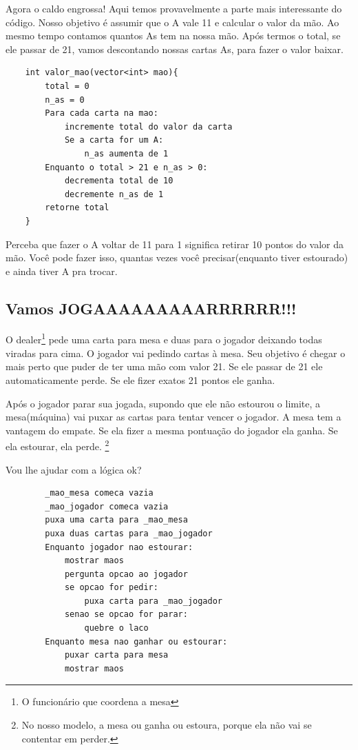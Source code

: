 \documentclass[12pt]{article}
\newcommand{\note}[1]{\footnote{#1}} %
\begin{document}
Agora o caldo engrossa! Aqui temos provavelmente a parte mais interessante do
código. Nosso objetivo é assumir que o A vale 11 e calcular o valor da mão. Ao
mesmo tempo contamos quantos As tem na nossa mão. Após termos o total, se ele
passar de 21, vamos descontando nossas cartas As, para fazer o valor baixar.

\begin{mdframed}[nobreak=true]
	\begin{lstlisting}
	int valor_mao(vector<int> mao){
		total = 0
		n_as = 0
		Para cada carta na mao:
			incremente total do valor da carta
			Se a carta for um A:
				n_as aumenta de 1
		Enquanto o total > 21 e n_as > 0:
			decrementa total de 10
			decremente n_as de 1
		retorne total
	}
	\end{lstlisting}
\end{mdframed}

Perceba que fazer o A voltar de 11 para 1 significa retirar 10 pontos do valor
da mão. Você pode fazer isso, quantas vezes você precisar(enquanto tiver
estourado) e ainda tiver A pra trocar.

\subsection{Vamos JOGAAAAAAAAARRRRRR!!!}

O dealer\note{O funcionário que coordena a mesa} pede uma carta
para mesa e duas para o jogador deixando todas viradas para cima. O jogador vai
pedindo cartas à mesa. Seu objetivo é chegar o mais perto que puder de ter uma
mão com valor 21. Se ele passar de 21 ele automaticamente perde. Se ele fizer
exatos 21 pontos ele ganha. 

Após o jogador parar sua jogada, supondo que ele não estourou o limite, a
mesa(máquina) vai puxar as cartas para tentar vencer o jogador. A mesa tem a
vantagem do empate. Se ela fizer a mesma pontuação do jogador ela ganha. Se ela
estourar, ela perde. \note{No nosso modelo, a mesa ou ganha ou estoura, porque
ela não vai se contentar em perder.}

Vou lhe ajudar com a lógica ok?

\begin{mdframed}[nobreak=true]
	\begin{lstlisting}
		_mao_mesa comeca vazia
		_mao_jogador comeca vazia
		puxa uma carta para _mao_mesa
		puxa duas cartas para _mao_jogador
		Enquanto jogador nao estourar:
			mostrar maos
			pergunta opcao ao jogador
			se opcao for pedir:
				puxa carta para _mao_jogador
			senao se opcao for parar:
				quebre o laco
		Enquanto mesa nao ganhar ou estourar:
			puxar carta para mesa
			mostrar maos

	\end{lstlisting}
\end{mdframed}
\end{document}
